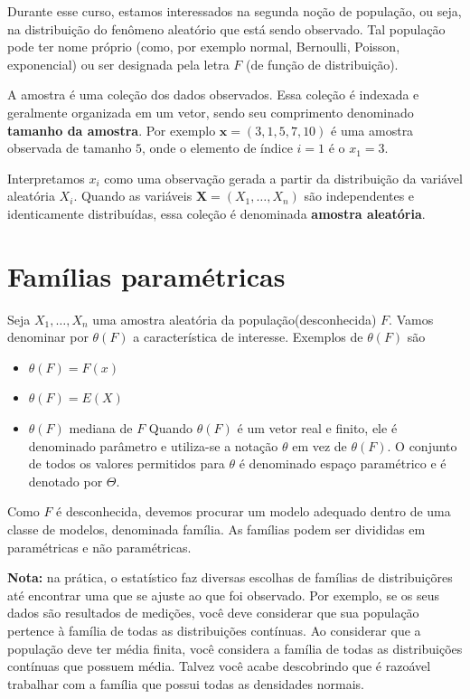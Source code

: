 \documentclass[
  letterpaper,
  DIV=11,
  numbers=noendperiod]{scrreprt}
\providecommand{\tightlist}{%
  \setlength{\itemsep}{0pt}\setlength{\parskip}{0pt}}\usepackage{longtable,booktabs,array}
\begin{document}
Durante esse curso, estamos interessados na segunda noção de população,
ou seja, na distribuição do fenômeno aleatório que está sendo observado.
Tal população pode ter nome próprio (como, por exemplo normal,
Bernoulli, Poisson, exponencial) ou ser designada pela letra \(F\) (de
função de distribuição).

A amostra é uma coleção dos dados observados. Essa coleção é indexada e
geralmente organizada em um vetor, sendo seu comprimento denominado
\textbf{tamanho da amostra}. Por exemplo \(\textbf{x}=(3,1,5,7,10)\) é
uma amostra observada de tamanho \(5\), onde o elemento de índice
\(i=1\) é o \(x_1=3\).

Interpretamos \(x_i\) como uma observação gerada a partir da
distribuição da variável aleatória \(X_i\). Quando as variáveis
\(\textbf{X}=(X_1,\ldots,X_n)\) são independentes e identicamente
distribuídas, essa coleção é denominada \textbf{amostra aleatória}.

\section{Famílias paramétricas}\label{famuxedlias-paramuxe9tricas}

Seja \(X_1,\ldots,X_n\) uma amostra aleatória da população(desconhecida)
\(F\). Vamos denominar por \(\theta(F)\) a característica de interesse.
Exemplos de \(\theta(F)\) são

\begin{itemize}
\tightlist
\item
  \(\theta(F)=F(x)\)
\item
  \(\theta(F)=E(X)\)
\item
  \(\theta(F)\) mediana de \(F\) Quando \(\theta(F)\) é um vetor real e
  finito, ele é denominado parâmetro e utiliza-se a notação \(\theta\)
  em vez de \(\theta(F)\). O conjunto de todos os valores permitidos
  para \(\theta\) é denominado espaço paramétrico e é denotado por
  \(\Theta\).
\end{itemize}

Como \(F\) é desconhecida, devemos procurar um modelo adequado dentro de
uma classe de modelos, denominada família. As famílias podem ser
divididas em paramétricas e não paramétricas.

\textbf{Nota:} na prática, o estatístico faz diversas escolhas de
famílias de distribuiçõres até encontrar uma que se ajuste ao que foi
observado. Por exemplo, se os seus dados são resultados de medições,
você deve considerar que sua população pertence à família de todas as
distribuições contínuas. Ao considerar que a população deve ter média
finita, você considera a família de todas as distribuições contínuas que
possuem média. Talvez você acabe descobrindo que é razoável trabalhar
com a família que possui todas as densidades normais.
\end{document}
